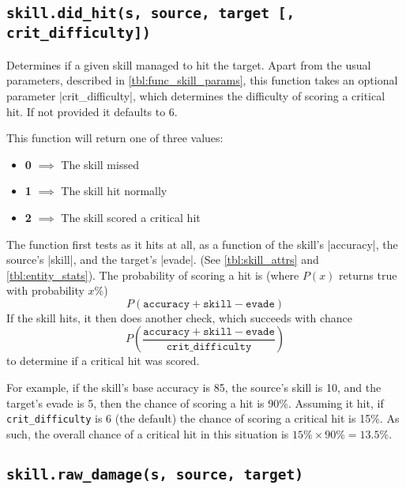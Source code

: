 \subsection{\lstinline{skill.did_hit(s, source, target [, crit_difficulty])}}
\label{sec:func_skill_didhit}

Determines if a given skill managed to hit the target.
Apart from the usual parameters, described in \autoref{tbl:func_skill_params},
this function takes an optional parameter |crit_difficulty|,
which determines the difficulty of scoring a critical hit.
If not provided it defaults to 6.

This function will return one of three values:
\begin{itemize}[noitemsep]
    \item \textbf{0} $\implies$ The skill missed
    \item \textbf{1} $\implies$ The skill hit normally
    \item \textbf{2} $\implies$ The skill scored a critical hit
\end{itemize}

The function first tests as it hits at all, as a function of
the skill's |accuracy|, the source's |skill|, and the target's |evade|.
(See \autoref{tbl:skill_attrs} and \autoref{tbl:entity_stats}).
The probability of scoring a hit is
(where $P(x)$ returns true with probability $x\%$)
\[ P\left(\texttt{accuracy} + \texttt{skill} - \texttt{evade}\right) \]
If the skill hits, it then does another check,
which succeeds with chance
\[ P\left(\frac
    {\texttt{accuracy} + \texttt{skill} - \texttt{evade}}
    {\texttt{crit\_difficulty}}\right) \]
to determine if a critical hit was scored.

For example, if the skill's base accuracy is 85,
the source's skill is 10, and the target's evade is 5,
then the chance of scoring a hit is 90\%.
Assuming it hit, if \texttt{crit\_difficulty} is 6 (the default)
the chance of scoring a critical hit is 15\%.
As such, the overall chance of a critical hit in this situation is
$15\%\times 90\% = 13.5\%$.


\subsection{\lstinline{skill.raw_damage(s, source, target)}}
\label{sec:func_skill_rawdamage}

